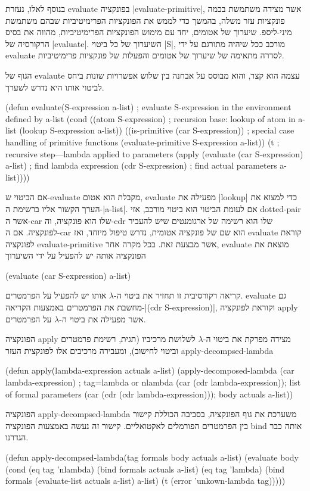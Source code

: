 בנוסף לאלו, נעזרת evaluate בפונקציה \E|evaluate-primitive|, אשר מצידה משתמשת
בכמה פונקציות עזר משלה, בהמשך כדי לממש את הפונקציות הפרימיטיביות שבהם משתמשת
מיני-ליספ. שיערוך של אטומים, יחד עם מימוש הפונקציות הפרימיטיביות, מהווה את
בסיס הרקורסיה של \E|evaluate|. השיערוך של כל ביטוי \E|S|, מורכב ככל שיהיה
מתורגם על ידי evaluate לסדרה מתאימה של שיערוך של אטומים והפעלות של פונקציות
פרימיטיביות.

הגוף של evalaute עצמה הוא קצר, והוא מבוסס על אבחנה בין שלוש אפשרויות שונות ביחס
לביטוי אותו היא נדרש לשערך.

\minipage\textwidth
\begin{KERNEL}
(defun evaluate(S-expression a-list) ; evaluate S-expression in the environment defined by a-list
  (cond ((atom S-expression) ; recursion base: lookup of atom in a-list
          (lookup S-expression a-list))
        ((is-primitive (car S-expression)) ; special case handling of primitive functions
          (evaluate-primitive S-expression a-list))
        (t ; recursive step---lambda applied to parameters
          (apply (evaluate (car S-expression) a-list) ; find lambda expression
                  (cdr S-expression) ; find actual parameters
                  a-list))))
\end{KERNEL}
\endminipage

אם הביטוי ש-evaluate מקבלת הוא אטום, evaluate מפעילה את \E|lookup| כדי למצוא את
הערך הקשור אליו ברשימת ה-\E|a-list|. אם לעומת הביטוי הוא ביטוי מורכב, אזי
dotted-pair אשר ה-car שלו הוא פונקציה, וה-cdr שלו הוא רשימה של
ארגומנטים שיש להעביר לפונקציה. אם ה-car הוא שם של פונקציה אטומית, נדרש טיפול
מיוחד, ואז evaluate קוראת לפונקציה evaluate-primitive אשר מבצעת זאת.
בכל מקרה אחר, evaluate מוצאת את הפונקציה אותה יש להפעיל על ידי השיערוך
\begin{LISP}
(evaluate (car S-expression) a-list)
\end{LISP}
קריאה רקורסיבית זו תחזיר את ביטוי ה-$λ$ אותו יש להפעיל על הפרמטרים. evaluate
גם מחשבת את הפרמטרים באמצעות הקריאה-\T|(cdr S-expression)|, וקוראת לפונקציה
apply אשר מפעילה את ביטוי ה-$λ$ על הפרמטרים.

הפונקציה apply מצידה מפרקת את ביטוי ה-$λ$ לשלושת מרכיביו (תגית, רשימת פרמטרים
וביטוי לחישוב), ומעבירה מרכיבים אלו לפונקצית העזר apply-decompsed-lambda
\begin{KERNEL}
(defun apply(lambda-expression actuals a-list)
  (apply-decomposed-lambda
    (car lambda-expression) ; tag=lambda or nlambda
    (car (cdr lambda-expression)); list of formal parameters
    (car (cdr (cdr lambda-expression))); body
    actuals
    a-list))
\end{KERNEL}
הפונקציה apply-decompsed-lambda משערכת את גוף הפונקציה, בסביבה הכוללת קישור בין
הפרמטרים הפורמלים לאקטואליים. קישור זה נעשה באמצעות הפונקציה bind אותה כבר
הגדרנו.
\begin{KERNEL}
(defun apply-decompsed-lambda(tag formals body actuals a-list)
  (evaluate body
    (cond (eq tag 'nlambda) (bind formals actuals a-list)
          (eq tag 'lambda) (bind formals (evaluate-list actuals a-list) a-list)
          (t (error 'unkown-lambda tag)))))
\end{KERNEL}

